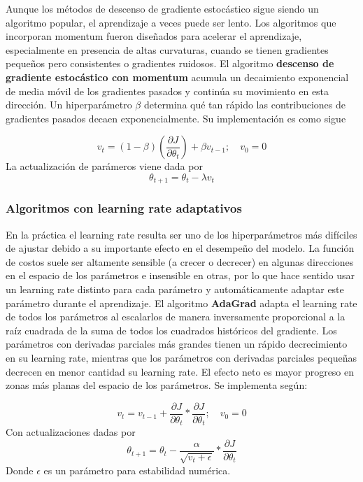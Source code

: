 Aunque los métodos de descenso de gradiente estoc\'astico sigue siendo un algoritmo popular, el aprendizaje a veces puede ser lento. Los algoritmos que incorporan momentum fueron dise{\~{n}}ados para acelerar el aprendizaje, especialmente en presencia de altas curvaturas, cuando se tienen gradientes peque{\~{n}}os pero consistentes o gradientes ruidosos. El algoritmo \textbf{descenso de gradiente estoc\'astico con momentum} acumula un decaimiento exponencial de media m\'ovil de los gradientes pasados y contin\'ua su movimiento en esta direcci\'on. Un hiperpar\'ametro $\beta$ determina qu\'e tan r\'apido las contribuciones de gradientes pasados decaen exponencialmente. Su implementación es como sigue 

\[
v_t = (1-\beta) \left ( \frac{\partial J}{\partial \theta_t} \right ) + \beta v_{t-1};  \quad v_0 = 0
\]
La actualización de parámeros viene dada por 
\[
\theta_{t+1} = \theta_t - \lambda v_t
\]

\subsubsection{Algoritmos con learning rate adaptativos}

En la pr\'actica el learning rate resulta ser uno de los hiperpar\'ametros m\'as dif\'iciles de ajustar debido a su importante efecto en el desempe{\~{n}}o del modelo. La funci\'on de costos suele ser altamente sensible (a crecer o decrecer) en algunas direcciones en el espacio de los par\'ametros e insensible en otras, por lo que hace sentido usar un learning rate distinto para cada par\'ametro y autom\'aticamente adaptar este par\'ametro durante el aprendizaje. El algoritmo \textbf{AdaGrad} adapta el learning rate de todos los par\'ametros al escalarlos de manera inversamente proporcional a la ra\'iz cuadrada de la suma de todos los cuadrados hist\'oricos del gradiente. Los par\'ametros con derivadas parciales m\'as grandes tienen un r\'apido decrecimiento en su learning rate, mientras que los par\'ametros con derivadas parciales peque{\~{n}}as decrecen en menor cantidad su learning rate. El efecto neto es mayor progreso en zonas m\'as planas del espacio de los par\'ametros. Se implementa según:

\[
v_{t} = v_{t-1} +  \frac{\partial J}{\partial \theta_t} * \frac{\partial J}{\partial \theta_t} ; \quad v_0 = 0
\] 
Con actualizaciones dadas por 
\[
\theta_{t+1} = \theta_t - \frac{\alpha}{\sqrt{v_t + \epsilon}} * \frac{\partial J}{\partial \theta_t}
\]
Donde $\epsilon$ es un parámetro para estabilidad numérica.\\

